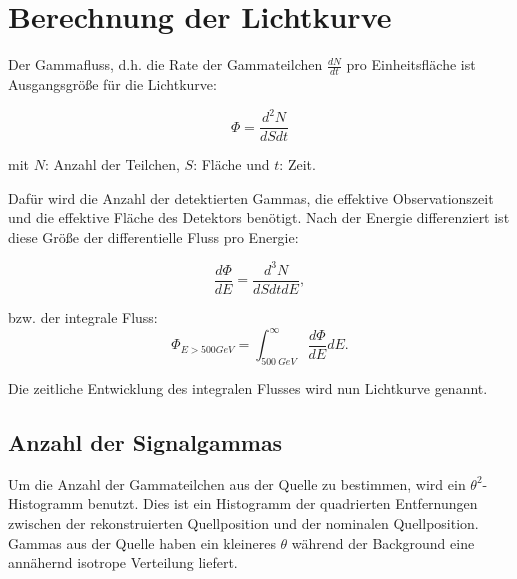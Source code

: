\section{Berechnung der Lichtkurve}
\label{sec:Lichtkurve}
Der Gammafluss, d.h. die Rate der Gammateilchen $\frac{dN}{dt}$ pro Einheitsfläche ist Ausgangsgröße für die Lichtkurve:

\begin{equation}
 \Phi=\frac{d^2 N}{dS dt} 
\end{equation}
\begin{centering}
  \small{mit $N$: Anzahl der Teilchen, $S$: Fläche und $t$: Zeit.}
 \end{centering}
 
Dafür wird die Anzahl der detektierten Gammas, die effektive Observationszeit und die effektive Fläche des Detektors benötigt.
Nach der Energie differenziert ist diese Größe der differentielle Fluss pro Energie:

\begin{equation}
 \frac{d\Phi}{dE}=\frac{d^3N}{dSdtdE},
\end{equation}

bzw. der integrale Fluss:
\begin{equation}
 \Phi_{E>500GeV}=\int_{\SI{500}{GeV}}^{\infty}\frac{d\Phi}{dE}dE.
\end{equation}


Die zeitliche Entwicklung des integralen Flusses wird nun Lichtkurve genannt.

\subsection{Anzahl der Signalgammas}
Um die Anzahl der Gammateilchen aus der Quelle zu bestimmen, wird ein $\theta^2$-Histogramm benutzt.
Dies ist ein Histogramm der quadrierten Entfernungen zwischen der rekonstruierten Quellposition und der nominalen Quellposition.
Gammas aus der Quelle haben ein kleineres $\theta$ während der Background eine annähernd isotrope Verteilung liefert. 

